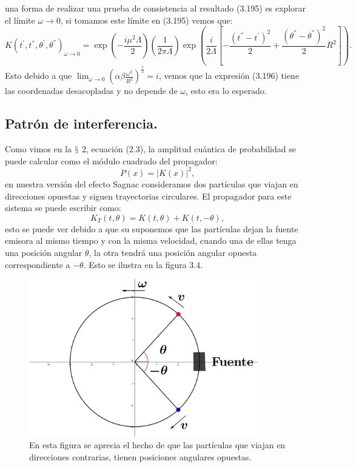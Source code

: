 una forma de realizar una prueba de consistencia al resultado (3.195) es explorar el límite $\omega \to 0$, si tomamos este límite en (3.195) vemos que:
\begin{equation}
K(t^{'},t^{''},\theta^{'},\theta^{''})_{\omega\to0}=\exp\left(-\frac{i\mu^{2}\Lambda}{2}\right)\left(\frac{1}{2\pi\Lambda}\right)\exp\left(\frac{i}{2\Lambda}\left[-\frac{(t^{''}-t^{'})^{2}}{2}+\frac{(\theta^{''}-\theta^{''})^{2}}{2}R^{2}\right]\right).
\end{equation} 
Esto debido a que $\lim_{\omega\to 0}\left(\alpha\beta\frac{\omega^2}{R^2}\right)^{\frac{1}{2}}=i$, vemos que la expresión (3.196) tiene las coordenadas desacopladas y no depende de $\omega$, esto era lo esperado.

\subsection{Patrón de interferencia.}
Como vimos en la $\mathsection$ 2, ecuación (2.3), la amplitud cuántica de probabilidad se puede calcular como el módulo cuadrado del propagador:
\begin{equation}
P(x)=|K(x)|^{2},
\end{equation}
en nuestra versión del efecto Sagnac consideramos dos partículas que viajan en direcciones opuestas y siguen trayectorias circulares. El propagador para este sistema se puede escribir como:
\begin{equation}
K_{T}(t,\theta)=K(t,\theta)+K(t,-\theta),
\end{equation}
esto se puede ver debido a que su suponemos que las partículas dejan la fuente emisora al mismo tiempo y con la misma velocidad, cuando una de ellas tenga una posición angular $\theta$, la otra tendrá una posición angular opuesta correspondiente a $-\theta$. Esto se ilustra en la figura 3.4.
\begin{figure}[h!]
\centering
\includegraphics[width=10cm]{Imagenes/Fig20}
\caption[Justificación esquemática del propagador.]{En esta figura se aprecia el hecho de que las partículas que viajan en direcciones contrarias, tienen posiciones angulares opuestas.}
\end{figure}
